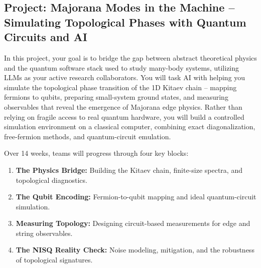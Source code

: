 \subsection{Project: Majorana Modes in the Machine – Simulating Topological Phases with Quantum Circuits and AI}

In this project, your goal is to bridge the gap between abstract theoretical physics and the quantum software stack used to study many-body systems, 
utilizing LLMs as your active research collaborators. 
You will task AI with helping you simulate the topological phase transition of the 1D Kitaev chain – mapping fermions to qubits, 
preparing small-system ground states, and measuring observables that reveal the emergence of Majorana edge physics. 
Rather than relying on fragile access to real quantum hardware, you will build a controlled simulation environment on a classical computer, combining exact diagonalization, free-fermion methods, and quantum-circuit emulation.

Over 14 weeks, teams will progress through four key blocks:
\begin{enumerate}
\item \textbf{The Physics Bridge:} Building the Kitaev chain, finite-size spectra, and topological diagnostics.
\item \textbf{The Qubit Encoding:} Fermion-to-qubit mapping and ideal quantum-circuit simulation.
\item \textbf{Measuring Topology:} Designing circuit-based measurements for edge and string observables.
\item \textbf{The NISQ Reality Check:} Noise modeling, mitigation, and the robustness of topological signatures.
\end{enumerate}


